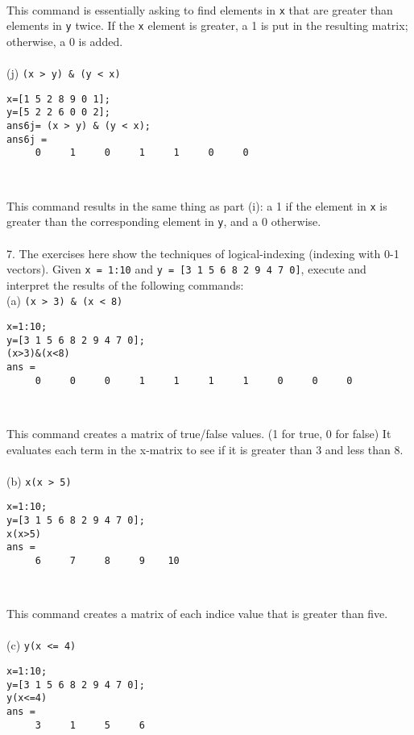 \documentclass [12pt] {article}
\begin{document}
\\\par This command is essentially asking to find elements in \verb|x| that are greater than elements in \verb|y| twice. If the \verb|x| element is greater, a 1 is put in the resulting matrix; otherwise, a 0 is added. \\
\\\indent(j) \verb|(x > y) & (y < x)|
\indent \begin{Verbatim}[xleftmargin=.5in]
x=[1 5 2 8 9 0 1]; 
y=[5 2 2 6 0 0 2];
ans6j= (x > y) & (y < x);
ans6j =
     0     1     0     1     1     0     0
\end{Verbatim} \\ 
\par This command results in the same thing as part (i): a 1 if the element in \verb|x| is greater than the corresponding element in \verb|y|, and a 0 otherwise. \\\\
7. The exercises here show the techniques of logical-indexing (indexing with 0-1 vectors).
Given \verb|x = 1:10| and \verb|y = [3 1 5 6 8 2 9 4 7 0]|, execute and interpret the results of
the following commands:
\\\indent(a) \verb|(x > 3) & (x < 8)| 
\indent \begin{Verbatim}[xleftmargin=.5in]
x=1:10;
y=[3 1 5 6 8 2 9 4 7 0];
(x>3)&(x<8)
ans =
     0     0     0     1     1     1     1     0     0     0
\end{Verbatim} \\ 
\par This command creates a matrix of true/false values. (1 for true, 0 for false) It evaluates each term in the x-matrix to see if it is greater than 3 and less than 8. \\ \newpage
\\\indent(b) \verb|x(x > 5)| 
\indent \begin{Verbatim}[xleftmargin=.5in]
x=1:10;
y=[3 1 5 6 8 2 9 4 7 0];
x(x>5)
ans =
     6     7     8     9    10
\end{Verbatim} \\ 
\par This command creates a matrix of each indice value that is greater than five. \\
\\\indent(c) \verb|y(x <= 4)| 
\indent \begin{Verbatim}[xleftmargin=.5in]
x=1:10;
y=[3 1 5 6 8 2 9 4 7 0];
y(x<=4)
ans =
     3     1     5     6
\end{Verbatim} \\ 
\end{document}

